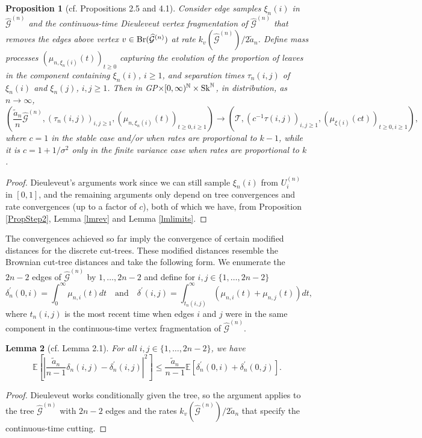 \documentclass[11pt,a4paper]{article}
\newtheorem{prop}{Proposition}[section]
\newtheorem{lm}[prop]{Lemma}
\newcommand{\bN}{\mathbb{N}}
\newcommand{\bE}{\mathbb{E}}
\newcommand{\cG}{\mathcal{G}}
\newcommand{\cT}{\mathcal{T}}
\begin{document}
\begin{prop}[cf. \cite{Die13} Propositions 2.5 and 4.1]\label{prop4.1} Consider edge samples $\xi_n(i)$ in $\widehat{\cG}^{(n)}$ and the continuous-time Dieuleveut 
  vertex fragmentation of $\widehat{\cG}^{(n)}$ that removes the edges above vertex $v\in{\rm Br}(\widehat{\cG}^{(n)})$ at rate $k_v(\widehat{\cG}^{(n)})/2\widetilde{a}_n$.
  Define mass processes $(\mu_{n,\xi_n(i)}(t))_{t\ge 0}$ capturing the evolution of the proportion of leaves in the component containing $\xi_n(i)$, $i\ge 1$, and   
  separation times $\tau_n(i,j)$ of $\xi_n(i)$ and $\xi_n(j)$, $i,j\ge 1$. Then in {\rm GP}$\times[0,\infty)^\bN\times{\rm Sk}^\bN$, in distribution, as $n\rightarrow\infty$,
  $$\left(\frac{\widetilde{a}_n}{n}\widehat{\cG}^{(n)},(\tau_n(i,j))_{i,j\ge 1},(\mu_{n,\xi_n(i)}(t))_{t\ge 0,i\ge 1}\right)\rightarrow\left(\cT,(c^{-1}\tau(i,j))_{i,j\ge 1},(\mu_{\xi(i)}(ct))_{t\ge 0,i\ge 1}\right),$$
  where $c=1$ in the stable case and/or when rates are proportional to $k-1$, while it is $c=1+1/\sigma^2$ only in the finite variance case when rates are
  proportional to $k$.
\end{prop}
\begin{proof} Dieuleveut's arguments work since we can still sample $\xi_n(i)$ from $U_i^{(n)}$ in $[0,1]$, and the remaining arguments only depend on tree convergences and
  rate convergences (up to a factor of $c$), both of which we have, from Proposition \ref{PropStep2}, Lemma \ref{lmrev} and Lemma \ref{lmlimits}.
\end{proof}

The convergences achieved so far imply the convergence of certain modified distances for the discrete cut-trees. These modified distances resemble the Brownian cut-tree
distances and take the following form. We enumerate the $2n-2$ edges of $\widehat{\cG}^{(n)}$ by $1,\ldots,2n-2$ and define for $i,j\in\{1,\ldots,2n-2\}$
$$\delta_n^\prime(0,i)=\int_0^\infty\mu_{n,i}(t)dt\quad\mbox{and}\quad\delta^\prime(i,j)=\int_{t_n(i,j)}^\infty(\mu_{n,i}(t)+\mu_{n,j}(t))dt,$$
where $t_n(i,j)$ is the most recent time when edges $i$ and $j$ were in the same component in the continuous-time vertex fragmentation of $\widehat{\cG}^{(n)}$.%

\begin{lm}[cf. \cite{Die13} Lemma 2.1]\label{lm2.1} For all $i,j\in\{1,\ldots,2n-2\}$, we have
  $$\bE\left[\left|\frac{\widetilde{a}_n}{n-1}\delta_n(i,j)-\delta_n^\prime(i,j)\right|^2\right]\le\frac{\widetilde{a}_n}{n-1}\bE\left[\delta_n^\prime(0,i)+\delta_n^\prime(0,j)\right].$$
\end{lm}
\begin{proof} Dieuleveut works conditionally given the tree, so the argument applies to the tree $\widehat{\cG}^{(n)}$ with $2n-2$ edges and the rates 
  $k_v(\widehat{\cG}^{(n)})/2\widetilde{a}_n$ that specify the continuous-time cutting. 
\end{proof}
\end{document}
